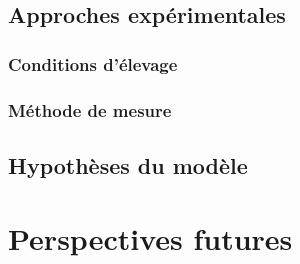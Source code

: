 \subsection{Approches expérimentales}

\subsubsection{Conditions d'élevage}

\subsubsection{Méthode de mesure}

\subsection{Hypothèses du modèle}

\section{Perspectives futures}